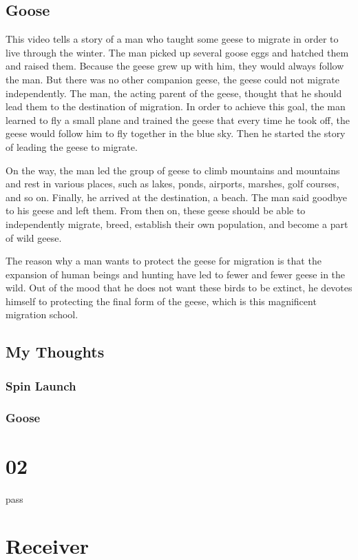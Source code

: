 \documentclass{article}
\begin{document}
\subsection{Goose}
This video tells a story of a man who taught some geese to migrate in order to live through the winter. The man picked up several goose eggs and hatched them and raised them. Because the geese grew up with him, they would always follow the man. But there was no other companion geese, the geese could not migrate independently. The man, the acting parent of the geese, thought that he should lead them to the destination of migration. In order to achieve this goal, the man learned to fly a small plane and trained the geese that every time he took off, the geese would follow him to fly together in the blue sky. Then he started the story of leading the geese to migrate.

On the way, the man led the group of geese to climb mountains and mountains and rest in various places, such as lakes, ponds, airports, marshes, golf courses, and so on. Finally, he arrived at the destination, a beach. The man said goodbye to his geese and left them. From then on, these geese should be able to independently migrate, breed, establish their own population, and become a part of wild geese.

The reason why a man wants to protect the geese for migration is that the expansion of human beings and hunting have led to fewer and fewer geese in the wild. Out of the mood that he does not want these birds to be extinct, he devotes himself to protecting the final form of the geese, which is this magnificent migration school.

\subsection{My Thoughts}

\subsubsection{Spin Launch}


\subsubsection{Goose}


\section{02}
pass
\section{Receiver}
\end{document}
